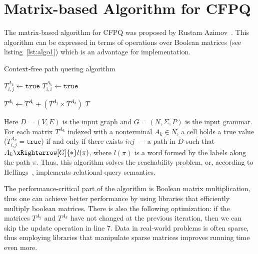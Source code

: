 \section{Matrix-based Algorithm for CFPQ}

The matrix-based algorithm for CFPQ was proposed by Rustam Azimov~\cite{Azimov:2018:CPQ:3210259.3210264}.
This algorithm can be expressed in terms of operations over Boolean matrices (see listing~\ref{lst:algo1}) which is an advantage for implementation.
{\small
\begin{algorithm}
\begin{algorithmic}[1]
\caption{Context-free path quering algorithm}
\label{lst:algo1}
          {$T^{A_k}_{i,j} \gets \texttt{true}$}
    \EndFor
       {$T^{A_k}_{i,i} \gets \texttt{true}$}
    \EndFor

          { $T^{A_i} \gets T^{A_i} + (T^{A_j} \times T^{A_k})$ } 
        \EndFor
    \EndWhile
\State \Return $T$
\EndFunction
\end{algorithmic}
\end{algorithm}
}

Here $D = (V, E)$ is the input graph and $G = (N,\Sigma,P)$ is the input grammar.
For each matrix $T^{A_k}$ indexed with a nonterminal $A_k \in N$, a cell holds a true value ($T^{A_k}_{i,j} = \texttt{true}$) if and only if there exists $i \pi j$~--- a path in $D$ such that $A_k \xRightarrow[G]{*} l(\pi) $, where $l(\pi)$ is a word formed by the labels along the path $\pi$.
Thus, this algorithm solves the reachability problem, or, according to Hellings~\cite{hellingsRelational}, implements relational query semantics.

The performance-critical part of the algorithm is Boolean matrix multiplication, thus one can achieve better performance by using libraries that efficiently multiply boolean matrices. 
There is also the following optimization: if the matrices $T^{A_j}$ and $T^{A_k}$ have not changed at the previous iteration, then we can skip the update operation in line 7.
Data in real-world problems is often sparse, thus employing libraries that manipulate sparse matrices improves running time even more. 
